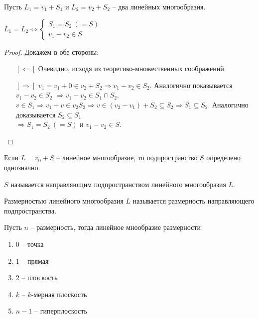Пусть $L_1 = v_1 + S_1$ и $L_2 = v_2 + S_2$ -- два линейных многообразия.
\begin{Suggestion}
	$L_1 = L_2 \Leftrightarrow 
	\begin{cases}
		S_1 = S_2 ~ (= S) \\
		v_1 - v_2 \in S
	\end{cases}$ 
\end{Suggestion}
\begin{proof}
	Докажем в обе стороны:
	\begin{enumerate}
		\item[{$[\Leftarrow]$}] Очевидно, исходя из теоретико-множественных соображений.
		\item[{$[\Rightarrow]$}] $v_1 = v_1 + 0 \in v_2 + S_2 \Rightarrow v_1 - v_2 \in S_2$. Аналогично показывается $v_1 - v_2 \in S_2$ $\Rightarrow v_1 - v_2 \in 
		S_1 \cap S_2$. \\
		$v \in S_1 \Rightarrow v_1 + v \in v_2  S_2 \Rightarrow v \in (v_2 - v_1) + S_2 \subseteq S_2 \Rightarrow S_1 \subseteq S_2$. Аналогично доказывается
		$S_2 \subseteq S_1$ \\
		$\Rightarrow S_1 = S_2 ~ (= S)$ и $v_1 - v_2 \in S$. 
	\end{enumerate}
\end{proof}
\begin{Consequence}
	Если $L = v_0 + S$ -- линейное многообразие, то подпространство $S$ определено однозначно.
\end{Consequence}

\begin{Def}
	$S$ называется направляющим подпространством линейного многообразия $L$.
\end{Def}

\begin{Def}
	Размерностью линейного многообразия $L$ называется размерность направляющего подпространства.
\end{Def}

Пусть $n$ -- размерность, тогда линейное мнообразие размерности
\begin{enumerate}[label=•]
	\item 0 -- точка
	\item 1 -- прямая
	\item 2 -- плоскость
	\item {$k$} -- $k$-мерная плоскость
	\item {${n-1}$} -- гиперплоскость \\
\end{enumerate}

